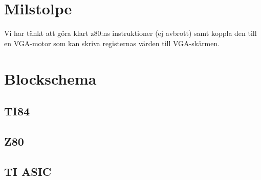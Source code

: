 \documentclass[12pt]{article}
\begin{document}
\section{Milstolpe}
Vi har tänkt att göra klart z80:ns instruktioner (ej avbrott) samt koppla den
till en VGA-motor som kan skriva registernas värden till VGA-skärmen.

\section{Blockschema}
\subsection{TI84}
\begin{figure}[H]
    \centering
    \def\svgwidth{0.9\columnwidth}
    
\end{figure}
\subsection{Z80}
\begin{figure}[H]
    \centering
    \def\svgwidth{0.87\columnwidth}
    
\end{figure}
\subsection{TI ASIC}
\begin{figure}[H]
    \centering
    \def\svgwidth{1.2\columnwidth}
    
\end{figure}
\end{document}
